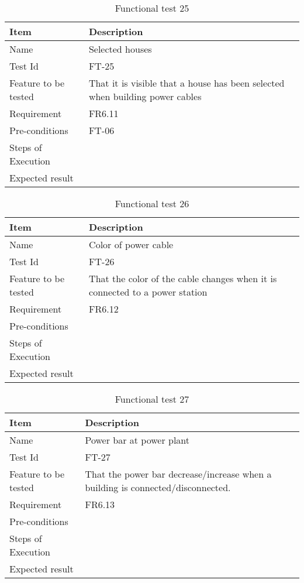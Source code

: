 \begin{table}[H]
\centering
	\begin{tabular}{ l | p{8cm} }
		\hline
		{\bf Item} & {\bf Description} \\ \hline
		Name & Selected houses \\ 
		Test Id & FT-25 \\ 
		Feature to be tested & That it is visible that a house has been selected when building power cables \\ 
		Requirement & FR6.11 \\ 
		Pre-conditions & FT-06 \\ 
		Steps of Execution & \\ 
		Expected result & \\ 
	\end{tabular}
	\caption{Functional test 25}
\end{table}

\begin{table}[H]
\centering
	\begin{tabular}{ l | p{8cm} }
		\hline
		{\bf Item} & {\bf Description} \\ \hline
		Name &  Color of power cable \\ 
		Test Id & FT-26 \\ 
		Feature to be tested & That the color of the cable changes when it is connected to a power station \\ 
		Requirement & FR6.12 \\ 
		Pre-conditions &  \\ 
		Steps of Execution & \\ 
		Expected result & \\ 
	\end{tabular}
	\caption{Functional test 26}
\end{table}

\begin{table}[H]
\centering
	\begin{tabular}{ l | p{8cm} }
		\hline
		{\bf Item} & {\bf Description} \\ \hline
		Name & Power bar at power plant \\ 
		Test Id & FT-27 \\ 
		Feature to be tested & That the power bar decrease/increase when a building is connected/disconnected. \\ 
		Requirement & FR6.13 \\ 
		Pre-conditions &  \\ 
		Steps of Execution & \\ 
		Expected result & \\ 
	\end{tabular}
	\caption{Functional test 27}
\end{table}